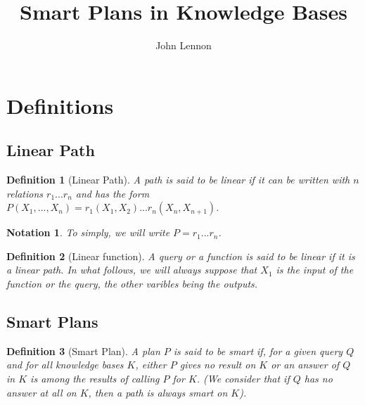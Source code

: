\documentclass[10pt,a4paper,draft]{article}
\title{Smart Plans in Knowledge Bases}
\author{John Lennon}
\begin{document}
\maketitle

\newtheorem{definition}{Definition}
\newtheorem{property}{Property}
\newtheorem{theorem}{Theorem}
\newtheorem{lemma}{Lemma}
\newtheorem{Corrollary}{Corrollary}
\newtheorem{hypothesis}{Hypothesis}
\newtheorem{notation}{Notation}
\newtheorem{example}{Example}

\LinesNumbered


\section{Definitions}

\subsection{Linear Path}

\begin{definition}[Linear Path]
A path is said to be linear if it can be written with $n$ relations $r_1 ... r_n$ and has the form $P(X_1, ..., X_n) = r_1(X_1, X_2) ... r_n(X_n, X_{n+1})$.
\end{definition}

\begin{notation}
To simply, we will write $P = r_1 ... r_n$.
\end{notation}

\begin{definition}[Linear function]
A query or a function is said to be linear if it is a linear path. In what follows, we will always suppose that $X_1$ is the input of the function or the query, the other varibles being the outputs.
\end{definition}


\subsection{Smart Plans}

\begin{definition}[Smart Plan]
A plan $P$ is said to be smart if, for a given query $Q$ and for all knowledge bases $K$, either $P$ gives no result on $K$ or an answer of $Q$ in $K$ is among the results of calling $P$ for $K$. (We consider that if $Q$ has no answer at all on $K$, then a path is always smart on $K$).
\end{definition}
\end{document}
